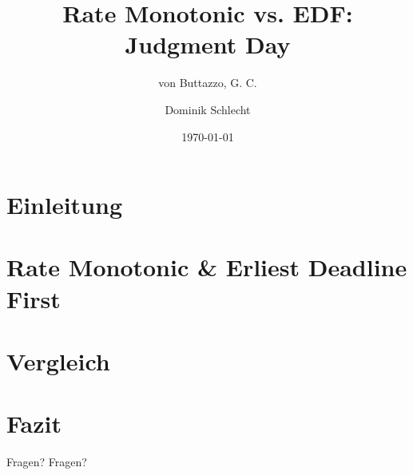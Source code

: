 \documentclass[unknownkeysallowed]{beamer}
\title{Rate Monotonic vs. EDF: Judgment Day}
\subtitle{von Buttazzo, G. C.}
\date{\today}
\author{Dominik Schlecht}
\institute[THI]{Technische Hochschule Ingolstadt}
\begin{document}
	\frame{\maketitle}
	\frame{\tableofcontents[hideallsubsections]}
	
	
	\section{Einleitung}
	
	
	\section{Rate Monotonic \& Erliest Deadline First}
	
	
	\section{Vergleich}
	
	
	\section{Fazit}
	
	
	\begin{frame}{Fragen?}
		Fragen?
	\end{frame}
	
\end{document}
